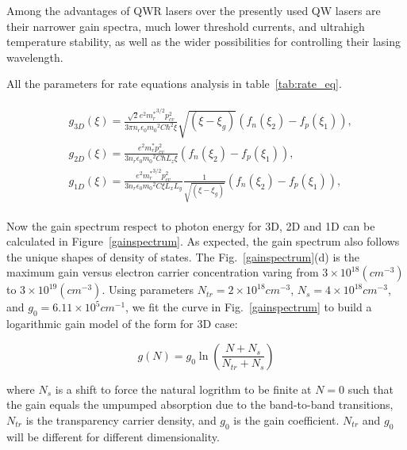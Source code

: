 Among the advantages of QWR lasers over the presently used QW lasers are their
narrower gain spectra, much lower threshold currents, and ultrahigh temperature
stability, as well as the wider possibilities for controlling their lasing
wavelength.

All the parameters for rate equations analysis in table~\ref{tab:rate_eq}.



\begin{eqnarray}
\begin{aligned}
  & g_{3D}(\xi)=\frac{\sqrt{2}e^2{m_r^\ast}^{3/2}{p_{cv}^2}}{3{\pi}n_r\epsilon_0{m_0}^2C{\hbar^2}\xi}{\sqrt{(\xi-\xi_g)}}(f_n(\xi_2)-f_p(\xi_1)),
\\
& g_{2D}(\xi)=\frac{e^2{m_r^\ast}{p_{cv}^2}}{3{n_r}\epsilon_0{m_0}^2C{\hbar}L_z\xi}(f_n(\xi_2)-f_p(\xi_1)),
\\
& g_{1D}(\xi)=\frac{e^2{m_r^\ast}^{3/2}{p_{cv}^2}}{3{n_r}\epsilon_0{m_0}^2C\xi{L_x}{L_y}}\frac{1}{\sqrt{(\xi-\xi_g)}}(f_n(\xi_2)-f_p(\xi_1)),
\end{aligned}
\label{eq:five}
\end{eqnarray}

Now the gain spectrum respect to photon energy for 3D, 2D and 1D can be calculated in
Figure~\ref{gainspectrum}. As expected, the gain spectrum also follows the unique shapes of
density of states. The Fig.~\ref{gainspectrum}(d) is the maximum gain versus electron
carrier concentration varing from $3\times10^{18} (cm^{-3})$ to
$3\times10^{19}(cm^{-3})$. Using parameters $N_{tr} = 2\times10^{18} cm^{-3}$,
$N_{s} = 4\times10^{18} cm^{-3}$, and $g_0 = 6.11\times10^{5} cm^{-1}$, we fit
the curve in Fig.~\ref{gainspectrum} to build a logarithmic gain model of the
form for 3D case:

\begin{equation}
  g(N) = g_0\ln\left(\frac{N+N_s}{N_{tr}+ N_s}\right)
\end{equation}

where $N_s$ is a shift to force the natural logrithm to be finite at $N = 0$
such that the gain equals the umpumped absorption due to the band-to-band
transitions, $N_{tr}$ is the transparency carrier density, and $g_0$ is the
gain coefficient. $N_{tr}$ and $g_0$ will be different for different
dimensionality.

